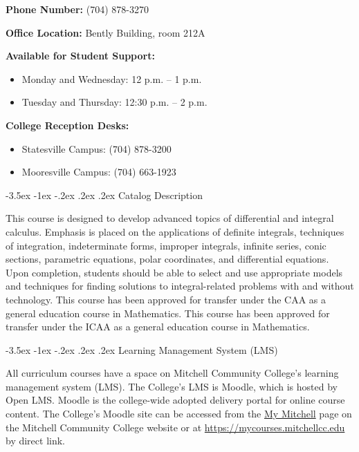 \documentclass{article}
\makeatletter
\renewcommand\section{\@startsection{section}{1}{0pt}%
  {-3.5ex \@plus -1ex \@minus -.2ex}%
  {.2ex \@plus.2ex}%
  {\normalfont\Large\bfseries}} %
\makeatother
\begin{document}
\textbf{Phone Number:} (704) 878-3270

\textbf{Office Location:} Bently Building, room 212A

\textbf{Available for Student Support:}

\begin{itemize}
\item Monday and Wednesday: 12 p.m. -- 1 p.m.
\item Tuesday and Thursday: 12:30 p.m. -- 2 p.m.
\end{itemize}

\textbf{College Reception Desks:}

\begin{itemize}
\item Statesville Campus: (704) 878-3200
\item Mooresville Campus: (704) 663-1923
\end{itemize}

\section{Catalog Description}

This course is designed to develop advanced topics of differential and integral calculus. Emphasis is placed on the applications of definite integrals, techniques of integration, indeterminate forms, improper integrals, infinite series, conic sections, parametric equations, polar coordinates, and differential equations. Upon completion, students should be able to select and use appropriate models and techniques for finding solutions to integral-related problems with and without technology. This course has been approved for transfer under the CAA as a general education course in Mathematics. This course has been approved for transfer under the ICAA as a general education course in Mathematics.

\section{Learning Management System (LMS)}

All curriculum courses have a space on Mitchell Community College's learning management system (LMS). The College's LMS is Moodle, which is hosted by Open LMS. Moodle is the college-wide adopted delivery portal for online course content. The College's Moodle site can be accessed from the \href{https://mitchellcc.edu/my-mitchell}{My Mitchell} page on the Mitchell Community College website or at \href{https://mycourses.mitchellcc.edu}{https://mycourses.mitchellcc.edu} by direct link.
\end{document}
